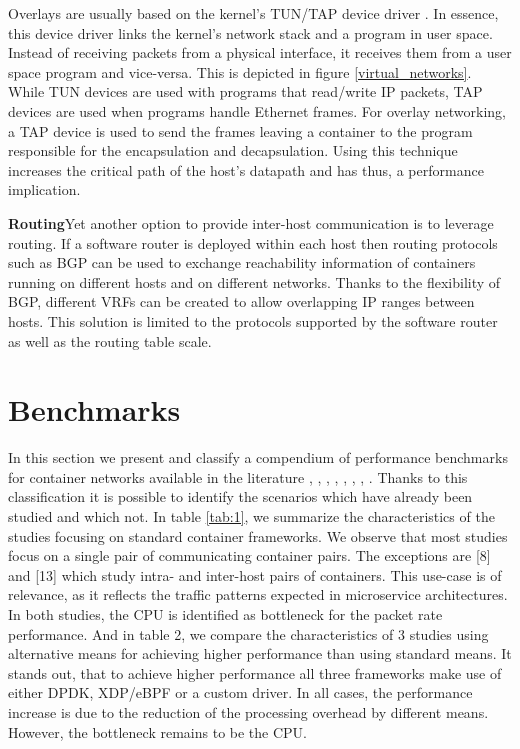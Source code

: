 \documentclass[conference]{IEEEtran}
\begin{document}
Overlays are usually based on the kernel's TUN/TAP device driver \cite{tuntap}. In essence, this device driver links the kernel's network stack and a program in user space. Instead of receiving packets from a physical interface, it receives them from a user space program and vice-versa. This is depicted in figure \ref{virtual_networks}. While TUN devices are used with programs that read/write IP packets, TAP devices are used when programs handle Ethernet frames. For overlay networking, a TAP device is used to send the frames leaving a container to the program responsible for the encapsulation and decapsulation. Using this technique increases the critical path of the host's datapath and has thus, a performance implication.

\noindent\textbf{Routing}\hspace{0.2cm}Yet another option to provide inter-host communication is to leverage routing. If a software router is deployed within each host then routing protocols such as BGP can be used to exchange reachability information of containers running on different hosts and on different networks. Thanks to the flexibility of BGP, different VRFs can be created to allow overlapping IP ranges between hosts. This solution is limited to the protocols supported by the software router as well as the routing table scale.

\section{Benchmarks}
In this section we present and classify a compendium of performance benchmarks for container networks available in the literature 
\cite{IEEE_INFOCOM_2018:K. Suo}, \cite{HotConNet_17:Zhao}, \cite{Nakamura:2018}, \cite{Boeira:2021}, \cite{Bankston:2018}, \cite{CoNEXT:2018}, \cite{ICTC_2018:Park}, \cite{NOMS_2016:Claassen}. Thanks to this classification it is possible to identify the scenarios which have already been studied and which not. In table \ref{tab:1}, we summarize the characteristics of the studies focusing on standard container frameworks. We observe that most studies focus on a single pair of communicating container pairs. The exceptions are [8] and [13] which study intra- and inter-host pairs of containers. This use-case is of relevance, as it reflects the traffic patterns expected in microservice architectures. In both studies, the CPU is identified as bottleneck for the packet rate performance. And in table 2, we compare the characteristics of 3 studies using alternative means for achieving higher performance than using standard means. It stands out, that to achieve higher performance all three frameworks make use of either DPDK, XDP/eBPF or a custom driver.  In all cases, the performance increase is due to the reduction of the processing overhead by different means. However, the bottleneck remains to be the CPU.
\end{document}
